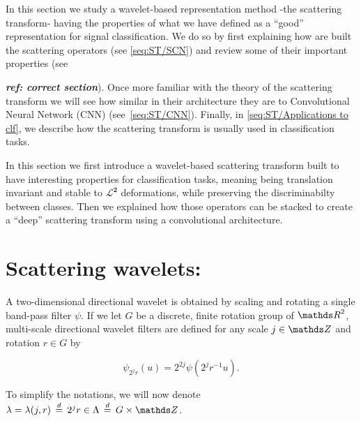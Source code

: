 \documentclass[a4paper,11pt]{report}
\begin{document}
	In this section we study a wavelet-based representation method -the scattering transform- having the properties of what we have defined as a ``good'' representation for signal classification. We do so by first explaining how are built the scattering operators (see \ref{seq:ST/SCN}) and review some of their important properties (see {\textbf{\textit{ref: correct section}}). Once more familiar with the theory of the scattering transform we will see how similar in their architecture they are to Convolutional Neural Network (CNN) (see~\ref{seq:ST/CNN}). Finally, in \ref{seq:ST/Applications to clf}, we describe how the scattering transform is usually used in classification tasks.
	
	    
    In this section we first introduce a wavelet-based scattering transform built to have interesting properties for classification tasks, meaning being translation invariant and stable to $\mathbf{\mathcal{L}^{2}}$ deformations, while preserving the discriminabilty between classes. Then we explained how those operators can be stacked to create a ``deep'' scattering transform using a convolutional architecture.
      
		\section{Scattering wavelets:}
			\label{seq:ST/Scattering wavelets}

			A two-dimensional directional wavelet is obtained by scaling and rotating a single band-pass filter $\psi$. If we let $G$ be a discrete, finite rotation group of $\dsR^{2}$, multi-scale directional wavelet filters are defined for any scale $j \in \dsZ$ and rotation $r \in G$ by
      
      \begin{equation}
				\label{eq:multi-scale directional wavelet}
				\psi_{2^{j}r}(u) = 2^{2j} \psi(2^{j}r^{-1}u).
      \end{equation}
      
      To simplify the notations, we will now denote $\lambda = \lambda(j,r) \; \eqdef \; 2^{j}r \in \Lambda \; \eqdef \; G \times \dsZ$.\\
      
}
\end{document}
